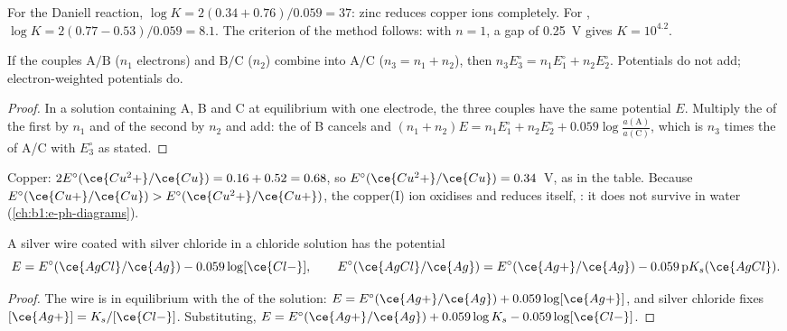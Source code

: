 For the Daniell reaction, $\log K = 2(0.34 + 0.76)/0.059 = 37$: zinc
reduces copper ions completely. For ,
$\log K = 2(0.77 - 0.53)/0.059 = 8.1$. The criterion of the method
follows: with $n = 1$, a gap of \qty{0.25}{V} gives $K = 10^{4.2}$.

\begin{proposition}\label{prop:b1:nernst:combined-potentials}
If the couples $\mathrm{A}/\mathrm{B}$ ($n_1$ electrons) and
$\mathrm{B}/\mathrm{C}$ ($n_2$) combine into $\mathrm{A}/\mathrm{C}$
($n_3 = n_1 + n_2$), then $n_3 E^\circ_3 = n_1 E^\circ_1 + n_2 E^\circ_2$.
Potentials do not add; electron-weighted potentials do.
\end{proposition}

\begin{proof}
In a solution containing A, B and C at equilibrium with one electrode,
the three couples have the same potential $E$. Multiply the  of the first by $n_1$ and of the second by $n_2$ and add: the
 of B cancels and $(n_1 + n_2)E = n_1E^\circ_1 + n_2E^\circ_2 +
0.059\log\frac{a(\mathrm{A})}{a(\mathrm{C})}$, which is $n_3$ times the
 of A/C with $E^\circ_3$ as stated.
\end{proof}

Copper: $2E^\circ(\ce{Cu^2+}/\ce{Cu}) = 0.16 + 0.52 = 0.68$, so
$E^\circ(\ce{Cu^2+}/\ce{Cu}) = 0.34$~V, as in the table. Because
$E^\circ(\ce{Cu+}/\ce{Cu}) > E^\circ(\ce{Cu^2+}/\ce{Cu+})$, the copper(I)
ion oxidises and reduces itself, : it does not
survive in water (\cref{ch:b1:e-ph-diagrams}).

\begin{proposition}\label{prop:b1:nernst:second-kind}
A silver wire coated with silver chloride in a chloride solution has the
potential
\[
  E = E^\circ(\ce{AgCl}/\ce{Ag}) - 0.059\log[\ce{Cl-}], \qquad
  E^\circ(\ce{AgCl}/\ce{Ag}) = E^\circ(\ce{Ag+}/\ce{Ag}) - 0.059\,\mathrm{p}K_s(\ce{AgCl}) .
\]
\end{proposition}

\begin{proof}
The wire is in equilibrium with the  of the solution:
$E = E^\circ(\ce{Ag+}/\ce{Ag}) + 0.059\log[\ce{Ag+}]$, and silver chloride
fixes $[\ce{Ag+}] = K_s/[\ce{Cl-}]$. Substituting,
$E = E^\circ(\ce{Ag+}/\ce{Ag}) + 0.059\log K_s - 0.059\log[\ce{Cl-}]$.
\end{proof}

